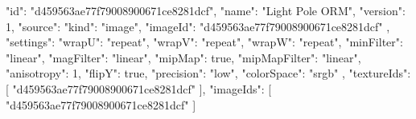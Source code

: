 {
  "id": "d459563ae77f79008900671ce8281dcf",
  "name": "Light Pole ORM",
  "version": 1,
  "source": {
    "kind": "image",
    "imageId": "d459563ae77f79008900671ce8281dcf"
  },
  "settings": {
    "wrapU": "repeat",
    "wrapV": "repeat",
    "wrapW": "repeat",
    "minFilter": "linear",
    "magFilter": "linear",
    "mipMap": true,
    "mipMapFilter": "linear",
    "anisotropy": 1,
    "flipY": true,
    "precision": "low",
    "colorSpace": "srgb"
  },
  "textureIds": [
    "d459563ae77f79008900671ce8281dcf"
  ],
  "imageIds": [
    "d459563ae77f79008900671ce8281dcf"
  ]
}
